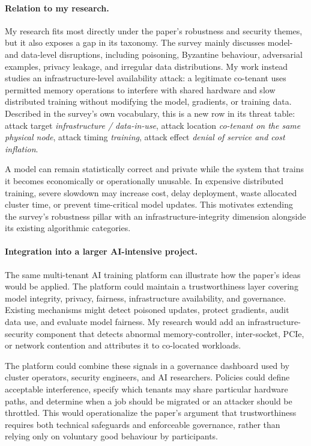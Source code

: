 \documentclass{article}
\begin{document}
\paragraph{Relation to my research.}

My research fits most directly under the paper's robustness and security
themes, but it also exposes a gap in its taxonomy. The survey mainly discusses
model- and data-level disruptions, including poisoning, Byzantine behaviour,
adversarial examples, privacy leakage, and irregular data distributions. My
work instead studies an infrastructure-level availability attack: a legitimate
co-tenant uses permitted memory operations to interfere with shared hardware
and slow distributed training without modifying the model, gradients, or
training data. Described in the survey's own vocabulary, this is a new row
in its threat table: attack target \emph{infrastructure / data-in-use}, attack
location \emph{co-tenant on the same physical node}, attack timing
\emph{training}, attack effect \emph{denial of service and cost inflation}.

A model can remain statistically correct and private while the system that
trains it becomes economically or operationally unusable. In expensive
distributed training, severe slowdown may increase cost, delay deployment,
waste allocated cluster time, or prevent time-critical model updates. This
motivates extending the survey's robustness pillar with an
infrastructure-integrity dimension alongside its existing algorithmic
categories.

\paragraph{Integration into a larger AI-intensive project.}

The same multi-tenant AI training platform can illustrate how the paper's ideas
would be applied. The platform could maintain a trustworthiness layer covering
model integrity, privacy, fairness, infrastructure availability, and
governance. Existing mechanisms might detect poisoned updates, protect
gradients, audit data use, and evaluate model fairness. My research would add
an infrastructure-security component that detects abnormal memory-controller,
inter-socket, PCIe, or network contention and attributes it to co-located
workloads.

The platform could combine these signals in a governance dashboard used by
cluster operators, security engineers, and AI researchers. Policies could
define acceptable interference, specify which tenants may share particular
hardware paths, and determine when a job should be migrated or an attacker
should be throttled. This would operationalize the paper's argument that
trustworthiness requires both technical safeguards and enforceable governance,
rather than relying only on voluntary good behaviour by participants.
\end{document}
